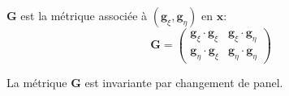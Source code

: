 \begin{definition}
$\mathbf{G}$ est la métrique associée à $(\mathbf{g}_{\xi}, \mathbf{g}_{\eta})$ en $\mathbf{x}$:
\begin{equation}
\mathbf{G} = \begin{pmatrix}
\mathbf{g}_{\xi} \cdot \mathbf{g}_{\xi} & \mathbf{g}_{\xi} \cdot \mathbf{g}_{\eta} \\
\mathbf{g}_{\eta} \cdot \mathbf{g}_{\xi} & \mathbf{g}_{\eta} \cdot \mathbf{g}_{\eta}
\end{pmatrix}
\end{equation}
\end{definition}

\begin{proposition}
La métrique $\mathbf{G}$ est invariante par changement de panel.
\end{proposition}

